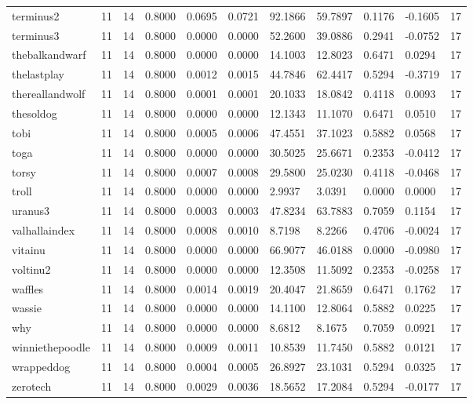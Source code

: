 \begin{table}[htbp]
\begin{tabular}{lllllllllll}
terminus2 & 11 & 14 & 0.8000 & 0.0695 & 0.0721 & 92.1866 & 59.7897 & 0.1176 & -0.1605 & 17 \\
terminus3 & 11 & 14 & 0.8000 & 0.0000 & 0.0000 & 52.2600 & 39.0886 & 0.2941 & -0.0752 & 17 \\
thebalkandwarf & 11 & 14 & 0.8000 & 0.0000 & 0.0000 & 14.1003 & 12.8023 & 0.6471 & 0.0294 & 17 \\
thelastplay & 11 & 14 & 0.8000 & 0.0012 & 0.0015 & 44.7846 & 62.4417 & 0.5294 & -0.3719 & 17 \\
thereallandwolf & 11 & 14 & 0.8000 & 0.0001 & 0.0001 & 20.1033 & 18.0842 & 0.4118 & 0.0093 & 17 \\
thesoldog & 11 & 14 & 0.8000 & 0.0000 & 0.0000 & 12.1343 & 11.1070 & 0.6471 & 0.0510 & 17 \\
tobi & 11 & 14 & 0.8000 & 0.0005 & 0.0006 & 47.4551 & 37.1023 & 0.5882 & 0.0568 & 17 \\
toga & 11 & 14 & 0.8000 & 0.0000 & 0.0000 & 30.5025 & 25.6671 & 0.2353 & -0.0412 & 17 \\
torsy & 11 & 14 & 0.8000 & 0.0007 & 0.0008 & 29.5800 & 25.0230 & 0.4118 & -0.0468 & 17 \\
troll & 11 & 14 & 0.8000 & 0.0000 & 0.0000 & 2.9937 & 3.0391 & 0.0000 & 0.0000 & 17 \\
uranus3 & 11 & 14 & 0.8000 & 0.0003 & 0.0003 & 47.8234 & 63.7883 & 0.7059 & 0.1154 & 17 \\
valhallaindex & 11 & 14 & 0.8000 & 0.0008 & 0.0010 & 8.7198 & 8.2266 & 0.4706 & -0.0024 & 17 \\
vitainu & 11 & 14 & 0.8000 & 0.0000 & 0.0000 & 66.9077 & 46.0188 & 0.0000 & -0.0980 & 17 \\
voltinu2 & 11 & 14 & 0.8000 & 0.0000 & 0.0000 & 12.3508 & 11.5092 & 0.2353 & -0.0258 & 17 \\
waffles & 11 & 14 & 0.8000 & 0.0014 & 0.0019 & 20.4047 & 21.8659 & 0.6471 & 0.1762 & 17 \\
wassie & 11 & 14 & 0.8000 & 0.0000 & 0.0000 & 14.1100 & 12.8064 & 0.5882 & 0.0225 & 17 \\
why & 11 & 14 & 0.8000 & 0.0000 & 0.0000 & 8.6812 & 8.1675 & 0.7059 & 0.0921 & 17 \\
winniethepoodle & 11 & 14 & 0.8000 & 0.0009 & 0.0011 & 10.8539 & 11.7450 & 0.5882 & 0.0121 & 17 \\
wrappeddog & 11 & 14 & 0.8000 & 0.0004 & 0.0005 & 26.8927 & 23.1031 & 0.5294 & 0.0325 & 17 \\
zerotech & 11 & 14 & 0.8000 & 0.0029 & 0.0036 & 18.5652 & 17.2084 & 0.5294 & -0.0177 & 17 \\

\end{tabular}
\end{table}
